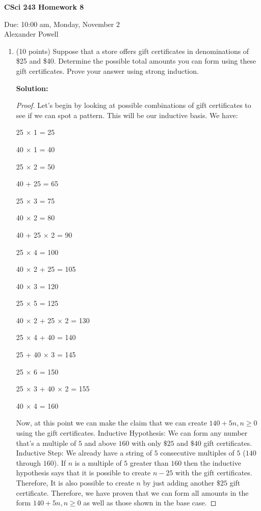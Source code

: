 \documentclass[11pt]{article}
\begin{document}
\begin{center}             %
\begin{LARGE}
{\bf CSci 243 Homework 8}
\end{LARGE}
\vskip 0.25cm      %

Due: 10:00 am, Monday, November 2 \\  %
Alexander Powell
\end{center}

\begin{enumerate}

\item (10 points)
Suppose that a store offers gift certificates in denominations of \$25 and
\$40. Determine the possible total amounts you can form using these gift
certificates. Prove your answer using strong induction.

\textbf{Solution: }
\begin{proof}

Let's begin by looking at possible combinations of gift certificates to see if we can spot a pattern.  This will be our inductive basis.  We have:
\begin{flushleft}
\small 25 $\times$ 1 = 25

\small 40 $\times$ 1 = 40

\small 25 $\times$ 2 = 50

\small 40 + 25 = 65

\small 25 $\times$ 3 = 75

\small 40 $\times$ 2 = 80

\small 40 + 25 $\times$ 2 = 90

\small 25 $\times$ 4 = 100

\small 40 $\times$ 2 + 25 = 105

\small 40 $\times$ 3 = 120

\small 25 $\times$ 5 = 125

\small 40 $\times$ 2 + 25 $\times$ 2 = 130

\small 25 $\times$ 4 + 40 = 140

\small 25 + 40 $\times$ 3 = 145

\small 25 $\times$ 6 = 150

\small 25 $\times$ 3 + 40 $\times$ 2 = 155

\small 40 $\times$ 4 = 160
\end{flushleft}

Now, at this point we can make the claim that we can create $140 + 5n, n \geq 0$ using the gift certificates.  
Inductive Hypothesis: We can form any number that's a multiple of $5$ and above $160$ with only $\$25$ and $\$40$ gift certificates.  
Inductive Step: We already have a string of $5$ consecutive multiples of $5$ ($140$ through $160$).  If $n$ is a multiple of $5$ greater than $160$ then the inductive hypothesis says that it is possible to create $n-25$ with the gift certificates.  Therefore, It is also possible to create $n$ by just adding another $\$25$ gift certificate.  Therefore, we have proven that we can form all amounts in the form $140 + 5n, n \geq 0$ as well as those shown in the base case.  
\end{proof}


\end{enumerate}
\end{document}
